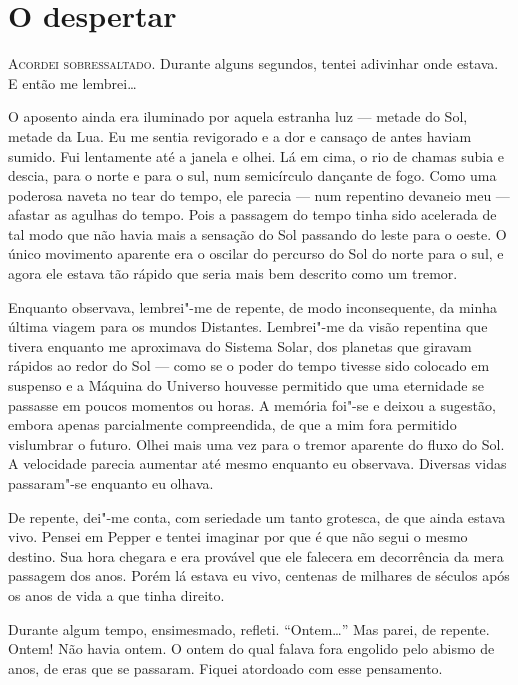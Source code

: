 \clearpage

\chapter{O despertar}

\textsc{Acordei sobressaltado.} Durante alguns segundos, tentei adivinhar onde estava. E então me lembrei\ldots{}

O aposento ainda era iluminado por aquela estranha luz --- metade do Sol, metade da Lua. Eu me sentia revigorado e a dor
e cansaço de antes haviam sumido. Fui lentamente até a janela e olhei. Lá em cima, o rio de chamas subia e descia,
para o norte e para o sul, num semicírculo dançante de fogo. Como uma poderosa naveta no tear do tempo, ele parecia ---
num repentino devaneio meu --- afastar as agulhas do tempo. Pois a passagem do tempo tinha sido acelerada de tal modo que
não havia mais a sensação do Sol passando do leste para o oeste. O único movimento aparente era o oscilar do percurso
do Sol do norte para o sul, e agora ele estava tão rápido que seria mais bem descrito como um tremor.

Enquanto observava, lembrei"-me de repente, de modo inconsequente, da minha última viagem para os mundos Distantes. Lembrei"-me da visão repentina que tivera enquanto me aproximava do Sistema Solar, dos planetas que giravam
rápidos ao redor do Sol --- como se o poder do tempo tivesse sido colocado em suspenso e a Máquina do Universo houvesse permitido que
uma eternidade se passasse em poucos momentos ou horas. A memória foi"-se e deixou a sugestão, embora apenas
parcialmente compreendida, de que a mim fora permitido vislumbrar o futuro. Olhei mais uma vez para o tremor aparente
do fluxo do Sol. A velocidade parecia aumentar até mesmo enquanto eu observava. Diversas vidas passaram"-se enquanto eu
olhava.

De repente, dei"-me conta, com seriedade um tanto grotesca, de que ainda estava vivo. Pensei em Pepper e tentei imaginar
por que é que não segui o mesmo destino. Sua hora chegara e era provável que ele falecera em decorrência da mera passagem
dos anos. Porém lá estava eu vivo, centenas de milhares de séculos após os anos de vida a que tinha direito.

Durante algum tempo, ensimesmado, refleti. ``Ontem\ldots{}'' Mas parei, de repente. Ontem! Não havia ontem. O ontem do
qual falava fora engolido pelo abismo de anos, de eras que se passaram. Fiquei atordoado com esse pensamento.


